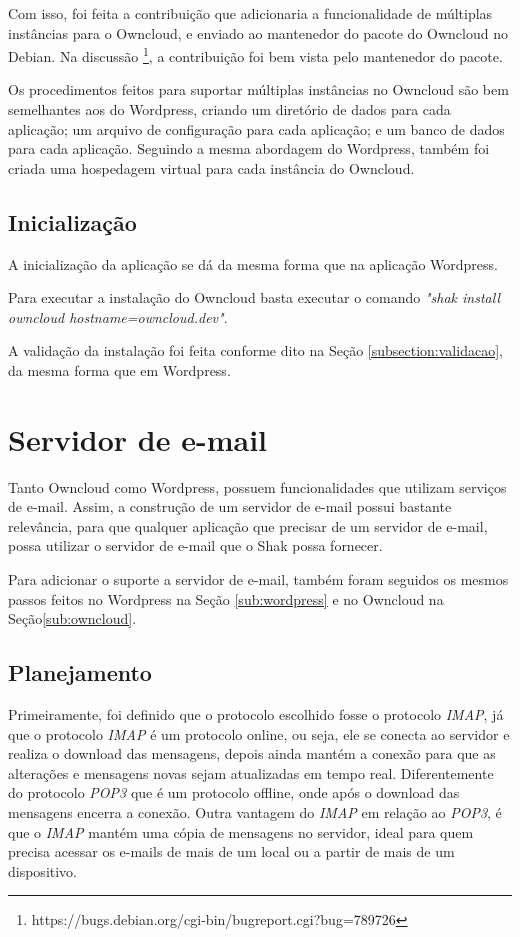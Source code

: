 Com isso, foi feita a contribuição que adicionaria a funcionalidade de múltiplas 
instâncias para o Owncloud, e enviado ao mantenedor do pacote do Owncloud no Debian. 
Na discussão \footnote{https://bugs.debian.org/cgi-bin/bugreport.cgi?bug=789726},
a contribuição foi bem vista pelo mantenedor do pacote.
 
Os procedimentos feitos para suportar múltiplas instâncias
no Owncloud são bem semelhantes aos do Wordpress, criando um diretório de dados
para cada aplicação; um arquivo de configuração para cada aplicação; e um banco de
dados para cada aplicação. Seguindo a mesma abordagem do Wordpress, também
foi criada uma hospedagem virtual para cada instância do Owncloud.

\subsection{Inicialização}

A inicialização da aplicação se dá da mesma forma que na aplicação Wordpress.

Para executar a instalação do Owncloud basta executar o comando \textit{"shak install owncloud hostname=owncloud.dev"}.

A validação da instalação foi feita conforme dito na Seção \ref{subsection:validacao}, 
da mesma forma que em Wordpress.

\section{Servidor de e-mail}
\label{sub:e-mail}

Tanto Owncloud como Wordpress, possuem funcionalidades que utilizam serviços 
de e-mail. Assim, a construção de um servidor de e-mail 
possui bastante relevância, para que qualquer aplicação que precisar de um 
servidor de e-mail, possa utilizar o servidor de e-mail que o Shak possa fornecer.

Para adicionar o suporte a servidor de e-mail, também foram seguidos os mesmos passos
feitos no Wordpress na Seção \ref{sub:wordpress} e no Owncloud na Seção\ref{sub:owncloud}. 

\subsection{Planejamento}

Primeiramente, foi definido que o protocolo escolhido fosse o protocolo \textit{IMAP}, já
que o protocolo \textit{IMAP} é um protocolo online, ou seja, ele se conecta ao servidor
e realiza o download das mensagens, depois ainda  mantém a conexão para que
as alterações e mensagens novas sejam atualizadas em tempo real. Diferentemente do
protocolo \textit{POP3} que é um protocolo offline, onde após o download das mensagens encerra
a conexão. Outra vantagem do \textit{IMAP} em relação ao \textit{POP3}, é que o 
\textit{IMAP} mantém uma cópia de mensagens no servidor, ideal para quem precisa 
acessar os e-mails de mais de um local ou a partir de mais de um dispositivo.


